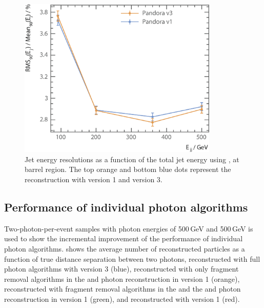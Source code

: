 



\begin{figure}[tbph]
\centering
\includegraphics[width=0.85\textwidth]{photon/JERnew2}
\caption[Jet energy resolution as a function of the di-jet energy]
{Jet energy resolutions as a function of the total jet energy using \eeZuds, at barrel region. The top orange and bottom blue dots represent the  reconstruction with \pandora version 1 and version 3.}
\label{fig:photonJER}
\end{figure}


\subsection{Performance of individual photon algorithms}





Two-photon-per-event samples with photon energies of  500\,GeV and 500\,GeV is used to show the incremental improvement of the performance of individual photon algorithms.  shows the average number of reconstructed particles as a function of true distance separation between two photons, reconstructed with full photon algorithms with \pandora version 3 (blue), reconstructed with only fragment removal algorithms in the \ECAL and photon reconstruction in  \pandora version 1 (orange), reconstructed with fragment removal algorithms in the \ECAL and the \HCAL and photon reconstruction in  \pandora version 1 (green), and reconstructed with \pandora version 1 (red).

